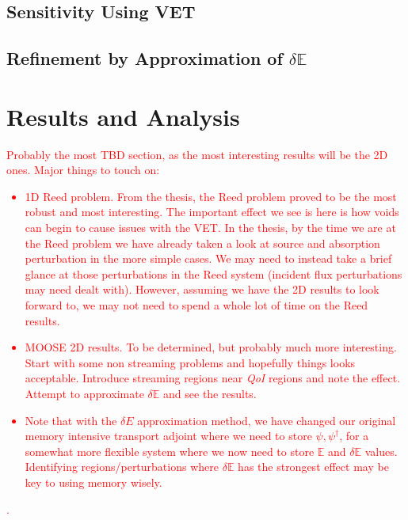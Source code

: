 \documentclass[review]{elsarticle}
\newcommand{\Edd}{\mathbb{E}}
\newcommand{\qoi}{{\it QoI}\xspace}
\newcommand{\comment}[2]{\marginpar{\textcolor{#2}{$\star$}}\textcolor{#2}{#1}\newline}
\newcommand{\iwh}[1]{\comment{#1}{red}}
\newcommand{\iwh}[1]{\phantom{a}}
\begin{document}
\subsection{Sensitivity Using VET}

\subsection{Refinement by Approximation of $\delta \Edd$}

\section{Results and Analysis}
\label{sec:RnA}
\iwh{Probably the most TBD section, as the most interesting results will be the 2D ones. Major things to touch on:
\begin{itemize}
\item 1D Reed problem. From the thesis, the Reed problem proved to be the most robust and most interesting. The important effect we see is here is how voids can begin to cause issues with the VET. In the thesis, by the time we are at the Reed problem we have already taken a look at source and absorption perturbation in the more simple cases. We may need to instead take a brief glance at those perturbations in the Reed system (incident flux perturbations may need dealt with). However, assuming we have the 2D results to look forward to, we may not need to spend a whole lot of time on the Reed results. 
\item MOOSE 2D results. To be determined, but probably much more interesting. Start with some non streaming problems and hopefully things looks acceptable. Introduce streaming regions near \qoi regions and note the effect. Attempt to approximate $\delta \Edd$ and see the results. 
\item Note that with the $\delta E$ approximation method, we have changed our original memory intensive transport adjoint where we need to store $\psi,\psi^\dag$, for a somewhat more flexible system where we now need to store $\Edd$ and $\delta \Edd$ values. Identifying regions/perturbations where $\delta \Edd$ has the strongest effect may be key to using memory wisely.
\end{itemize}
.}
\end{document}
